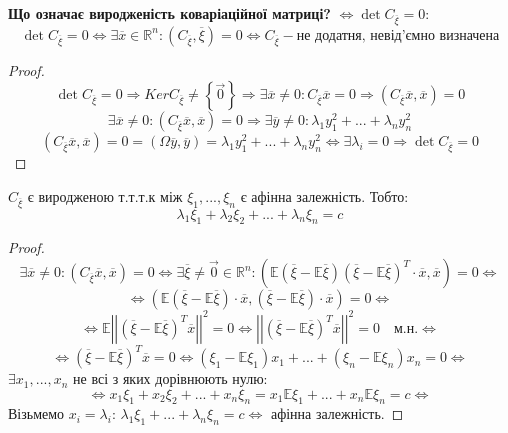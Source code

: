 \documentclass[14pt,a4paper]{scrartcl}
\theoremstyle{definition}
\theoremstyle{remark}
\theoremstyle{definition}
\theoremstyle{definition}
\begin{document}
\textbf{Що означає виродженість коваріаційної матриці?} $ \Leftrightarrow \det C_{ \overline{\xi}} = 0$:
$$
\det C_{ \overline{\xi}} = 0 \Leftrightarrow \exists \overline{x} \in \mathbb{R}^n: \left( C_{\overline{\xi}}, \overline{\xi} \right) = 0
\Leftrightarrow C_{ \overline{\xi}} - \text{не додатня, невід'ємно визначена}
$$
\begin{proof}
$$
\det C_{ \overline{\xi}} = 0 \Rightarrow Ker C_{ \overline{\xi}} \neq \left\lbrace \vec{0} \right\rbrace \Rightarrow \exists \overline{x} \neq 0: C_{ \overline{\xi}} \overline{x} = 0\Rightarrow \left( C_{\overline{\xi}} \overline{x}, \overline{x} \right) = 0
$$
$$
\exists \overline{x} \neq 0: \left( C_{\overline{\xi}} \overline{x}, \overline{x} \right) = 0 \Rightarrow \exists \overline{y} \neq 0: \lambda_1 y_1^2 + ... + \lambda_n y_n^2
$$
$$
\left( C_{\overline{\xi}} \overline{x}, \overline{x} \right) = 0 = \left( \Omega \overline{y}, \overline{y} \right) = \lambda_1 y_1^2 + ... + \lambda_n y_n^2\Leftrightarrow \exists \lambda_i = 0 \Rightarrow \det C_{ \overline{\xi}} = 0
$$
\end{proof}
\begin{boxteo}
	$C_{\overline{\xi}}$ є виродженою т.т.т.к між $ \xi_1, ... , \xi_n$ є афінна залежність. Тобто:
	$$\lambda_1 \xi_1 + \lambda_2 \xi_2 +...+ \lambda_n \xi_n = c$$
\end{boxteo}
\begin{proof}
 $$
\exists \overline{x} \neq 0: \left( C_{\overline{\xi}} \overline{x}, \overline{x} \right) = 0 \Leftrightarrow \exists \overline{ \xi} \neq \vec{0} \in \mathbb{R}^n: \left( \mathbb{E}( \overline{\xi} - \mathbb{E}\overline{\xi})(\overline{\xi} - \mathbb{E} \overline{\xi})^T \cdot \overline{x}, \overline{x} \right) = 0 \Leftrightarrow
 $$
 $$
\Leftrightarrow  \left( \mathbb{E}( \overline{\xi} - \mathbb{E}\overline{\xi}) \cdot \overline{x},(\overline{\xi} - \mathbb{E} \overline{\xi})\cdot \overline{x} \right) = 0 \Leftrightarrow
 $$
 $$
 \Leftrightarrow \mathbb{E} \left| \left|  \left( \overline{\xi} - \mathbb{E}\overline{\xi} \right)^T \overline{x}  \right|  \right|^2 = 0 \Leftrightarrow \left| \left|  \left( \overline{\xi} - \mathbb{E}\overline{\xi} \right)^T \overline{x}  \right|  \right|^2 = 0 \quad \text{м.н.}
\Leftrightarrow $$
$$
\Leftrightarrow\left( \overline{\xi} - \mathbb{E}\overline{\xi} \right)^T \overline{x} = 0 \Leftrightarrow \left( \xi_1 - \mathbb{E} \xi_1 \right) x_1 + ... + (\xi_n - \mathbb{E}\xi_n) x_n = 0 \Leftrightarrow
$$
$ \exists x_1, ..., x_n$ не всі з яких дорівнюють нулю:
$$
\Leftrightarrow
x_1 \xi_1 + x_2 \xi_2 + ... + x_n \xi_n  = x_1 \mathbb{E}\xi_1 + ... + x_n \mathbb{E}\xi_n = c
\Leftrightarrow
$$
Візьмемо $ x_i = \lambda_i$: $ \lambda_1 \xi_1 + ... + \lambda_n \xi_n = c \Leftrightarrow$ афінна залежність.
\end{proof}
\end{document}
